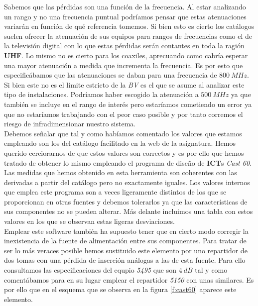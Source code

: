 \documentclass{article}[12 pt]
\begin{document}
			Sabemos que las pérdidas son una función de la frecuencia. Al estar analizando un rango y no una frecuencia puntual podríamos pensar que estas atenuaciones variarán en función de qué referencia tomemos. Si bien esto es cierto los catálogos suelen ofrecer la atenuación de sus equipos para rangos de frecuencias como el de la televisión digital con lo que estas pérdidas serán contantes en toda la ragión \textbf{UHF}. Lo mismo no es cierto para los coaxiles, aprecuando como cabría esperar una mayor atenuación a medida que incrementa la frecuencia. Es por esto que especificábamos que las atenuaciones se daban para una frecuencia de $800\ MHz$. Si bien este no es el límite estricto de la \textit{BV} es el que se asume al analizar este tipo de instalaciones. Podríamos haber escogido la atenuación a $500\ MHz$ ya que también se incluye en el rango de interés pero estaríamos cometiendo un error ya que no estaríamos trabajando con el peor caso posible y por tanto corremos el riesgo de infradimensionar nuestro sistema.\\

			Debemos señalar que tal y como habíamos comentado los valores que estamos empleando son los del catálogo facilitado en la web de la asignatura. Hemos querido cerciorarnos de que estos valores son correctos y es por ello que hemos tratado de obtener lo mismo empleando el programa de diseño de \textbf{ICT}s \textit{Cast 60}. Las medidas que hemos obtenido en esta herramienta son coherentes con las derivadas a partir del catálogo pero no exactamente iguales. Los valores internos que emplea este programa son a veces ligeramente distintos de los que se proporcionan en otras fuentes y debemos tolerarlos ya que las características de sus componentes no se pueden alterar. Más delante incluimos una tabla con estos valores en los que se observan estas ligeras desviaciones.\\

			Emplear este software también ha supuesto tener que en cierto modo corregir la inexistencia de la fuente de alimentación entre sus componentes. Para tratar de ser lo más veraces posible hemos sustituido este elemento por uno repartidor de dos tomas con una pérdida de inserción análogas a las de esta fuente. Para ello consultamos las especificaciones del equpio \textit{5495} que son $4\ dB$ tal y como comentábamos para en su lugar emplear el repartidor \textit{5150} con unas similares. Es por ello que en el esquema que se observa en la figura \ref{f:cast60} aparece este elemento.\\
\end{document}
